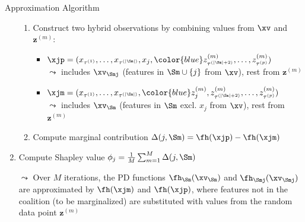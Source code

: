 \documentclass[11pt,compress,t,notes=noshow, aspectratio=169, xcolor=table]{beamer}
\begin{document}
\begin{frame}{Approximation Algorithm }
\begin{enumerate}[<+->]
\begin{enumerate}
        \item Construct two hybrid observations by combining values from $\xv$ and {\color{blue} $\mathbf{z}^{(m)}$}:
\begin{itemize}
\setlength\itemsep{0.5em}
  \item $
  \xjp = (x_{\tau^{(1)}}, \ldots, x_{\tau^{(|\Sm|)}}, x_j, 
          {\color{blue}z_{\tau^{(|\Sm|+2)}}^{(m)}, \ldots, z_{\tau^{(p)}}^{(m)}})
  $\\
  $\leadsto$ includes $\xv_{\Smj}$ (features in $\Sm \cup \{j\}$ from $\xv$), rest from {\color{blue} $\mathbf{z}^{(m)}$}
  
  \item $
  \xjm = (x_{\tau^{(1)}}, \ldots, x_{\tau^{(|\Sm|)}}, 
          {\color{blue}z_j^{(m)}, z_{\tau^{(|\Sm|+2)}}^{(m)}, \ldots, z_{\tau^{(p)}}^{(m)}})
  $\\
   $\leadsto$ includes $\xv_{\Sm}$ (features in $\Sm$ excl. $x_j$ from $\xv$), rest from {\color{blue} $\mathbf{z}^{(m)}$}
\end{itemize}
        \item Compute marginal contribution $\Delta(j, \Sm) = \fh(\xjp) - \fh(\xjm)$ %
        \end{enumerate}
        
    \item Compute Shapley value $\phi_j = \frac{1}{M}\sum_{m=1}^M \Delta(j, \Sm)$ %
    \item[$\leadsto$] Over $M$ iterations, the PD functions $\fh_{\Sm}(\xv_{\Sm})$ and $\fh_{\Smj}(\xv_{\Smj})$ are approximated by $\fh(\xjm)$ and $\fh(\xjp)$, where features not in the coalition (to be marginalized) are substituted with values from the random data point {\color{blue} $\mathbf{z}^{(m)}$}
  \end{enumerate}
   

\end{frame}
\end{document}
